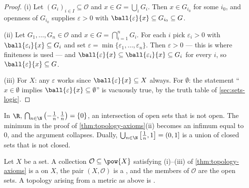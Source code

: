 \begin{proof}
	(i) Let $(G_i)_{i\in I}\subseteq\mathcal O$ and $x\in G=\bigcup_iG_i$. Then
	$x\in G_{i_0}$ for some $i_0$, and openness of $G_{i_0}$ supplies
	$\varepsilon>0$ with $\ball{\varepsilon}{x}\subseteq G_{i_0}\subseteq G$.

	(ii) Let $G_1,\dots,G_n\in\mathcal O$ and $x\in G=\bigcap_{i=1}^nG_i$. For each
	$i$ pick $\varepsilon_i>0$ with $\ball{\varepsilon_i}{x}\subseteq G_i$ and set
	$\varepsilon=\min\{\varepsilon_1,\dots,\varepsilon_n\}$. Then $\varepsilon>0$
	--- this is where finiteness is used --- and
	$\ball{\varepsilon}{x}\subseteq\ball{\varepsilon_i}{x}\subseteq G_i$ for every
	$i$, so $\ball{\varepsilon}{x}\subseteq G$.

	(iii) For $X$: any $\varepsilon$ works since $\ball{\varepsilon}{x}\subseteq X$
	always. For $\emptyset$: the statement ``$x\in\emptyset$ implies
	$\ball{\varepsilon}{x}\subseteq\emptyset$'' is vacuously true, by the truth
	table of \autoref{sec:sets-logic}.
\end{proof}

\begin{eg}
	\label{eg:infinite-intersection}
	In $\R$, $\bigcap_{n\in\N}\left(-\tfrac1n,\tfrac1n\right)=\{0\}$, an
	intersection of open sets that is not open. The minimum in the proof of
	\autoref{thm:topology-axioms}(ii) becomes an infimum equal to $0$, and the
	argument collapses. Dually, $\bigcup_{n\in\N}\left[\tfrac1n,1\right]=(0,1]$ is a
	union of closed sets that is not closed.
\end{eg}

\begin{definition}\label{def:topological-space}
	Let $X$ be a set. A collection $\mathcal{O}\subseteq\pow{X}$ satisfying
	(i)--(iii) of \autoref{thm:topology-axioms} is a  on $X$, the pair
	$(X,\mathcal{O})$ is a , and the members of
	$\mathcal{O}$ are the open sets. A topology arising from a metric as above is
	.
\end{definition}

